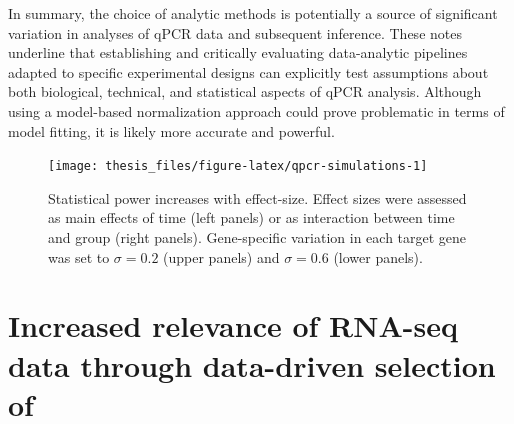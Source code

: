 \documentclass[twoside,10pt]{gihclass} %
\begin{document}
In summary, the choice of analytic methods is potentially a source of significant variation in analyses of qPCR data and subsequent inference.
These notes underline that establishing and critically evaluating data-analytic pipelines adapted to specific experimental designs can explicitly test assumptions about both biological, technical, and statistical aspects of qPCR analysis.
Although using a model-based normalization approach could prove problematic in terms of model fitting, it is likely more accurate and powerful.
\begin{figure}

{\centering \texttt{[image: thesis\_files/figure-latex/qpcr-simulations-1]} 

}

\caption[qPCR power-simulation]{Statistical power increases with effect-size. Effect sizes were assessed as main effects of time (left panels) or as interaction between time and group (right panels). Gene-specific variation in each target gene was set to $\sigma=0.2$ (upper panels) and $\sigma=0.6$ (lower panels).}\label{fig:qpcr-simulations}
\end{figure}
\hypertarget{increased-relevance-of-rna-seq-data-through-data-driven-selection-of}{%
\section{Increased relevance of RNA-seq data through data-driven selection of}\label{increased-relevance-of-rna-seq-data-through-data-driven-selection-of}}
\end{document}
